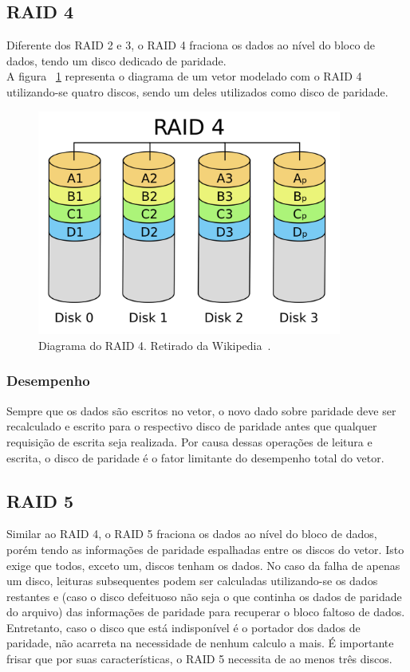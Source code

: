 		\subsection{RAID 4}
		Diferente dos RAID 2 e 3, o RAID 4 fraciona os dados ao nível do bloco de dados, tendo um disco dedicado de paridade. \\
		
		A figura ~\ref{fig:raid4} representa o diagrama de um vetor modelado com o RAID 4 utilizando-se quatro discos, sendo um deles utilizados como disco de paridade.\\
		
		\begin{figure}[htb]
			\begin{center}
				
				\includegraphics[clip,width=10.0cm]{images/RAID_4.png}
				\caption{Diagrama do RAID 4. Retirado da Wikipedia~\citep{wikiRAIDlevels}.}
				\label{fig:raid4}
			\end{center}
		\end{figure} 
		
		\subsubsection{Desempenho}
		Sempre que os dados são escritos no vetor, o novo dado sobre paridade deve ser recalculado e escrito para o respectivo disco de paridade antes que qualquer requisição de escrita seja realizada. Por causa dessas operações de leitura e escrita, o disco de paridade é o fator limitante do desempenho total do vetor.\\
		
		\subsection{RAID 5}
		Similar ao RAID 4, o RAID 5 fraciona os dados ao nível do bloco de dados, porém tendo as informações de paridade espalhadas entre os discos do vetor. Isto exige que todos, exceto um, discos tenham os dados. No caso da falha de apenas um disco, leituras subsequentes podem ser calculadas utilizando-se os dados restantes e (caso o disco defeituoso não seja o que continha os dados de paridade do arquivo) das informações de paridade para recuperar o bloco faltoso de dados. Entretanto, caso o disco que está indisponível é o portador dos dados de paridade, não acarreta na necessidade de nenhum calculo a mais. É importante frisar que por suas características, o RAID 5 necessita de ao menos três discos.  \\
		
